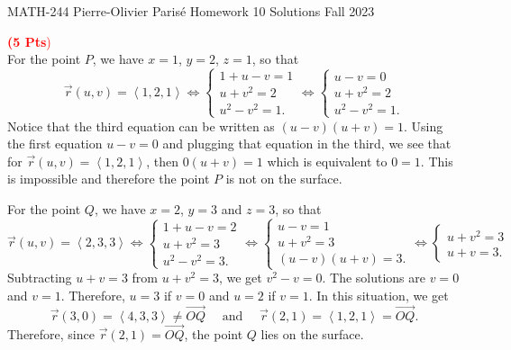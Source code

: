 \documentclass[12pt]{article}
\newcommand{\spc}{\vspace*{0.5cm}}
\newcommand{\exo}[3]{\noindent\textcolor{red}{\fbox{\textbf{Section {#1}, Problem {#2}}}\hrulefill   \textbf{({#3} Pts})}\vspace*{10pt}}
\begin{document}
\thispagestyle{empty}
	\noindent \hrulefill \newline
	MATH-244 \hfill Pierre-Olivier Paris{\'e}\newline
	Homework 10 Solutions \hfill Fall 2023\newline \vspace*{-0.7cm}
	
	\noindent\hrulefill
	
	\spc

	\exo{16.6}{2}{5}
	\\ 
	For the point $P$, we have $x = 1$, $y = 2$, $z=1$, so that
		\[
			\vec{r} (u, v) = \left\langle 1, 2, 1 \right\rangle \iff \left\lbrace \begin{matrix} 1 + u - v = 1 \\ 
			u + v^2 = 2 \\ 
			u^2 - v^2 = 1 . \end{matrix}\right. \iff \left\lbrace \begin{matrix} u - v = 0 \\ 
			u + v^2 = 2 \\ 
			u^2 - v^2 = 1 . \end{matrix}\right. 
		\]
	Notice that the third equation can be written as $(u - v)(u + v) = 1$. Using the first equation $u - v = 0$ and plugging that equation in the third, we see that for $\vec{r} (u, v) = \left\langle 1 , 2, 1 \right\rangle$, then $0 (u + v) = 1$ which is equivalent to $0 = 1$. This is impossible and therefore the point $P$ is not on the surface.

	For the point $Q$, we have $x = 2$, $y = 3$ and $z = 3$, so that
		\[
			\vec{r} (u, v) = \left\langle 2, 3, 3 \right\rangle \iff \left\lbrace \begin{matrix} 1 + u - v = 2 \\ 
			u + v^2 = 3 \\ 
			u^2 - v^2 = 3 . \end{matrix}\right. \iff \left\lbrace \begin{matrix} u - v = 1 \\ 
			u + v^2 = 3 \\ 
			(u-v)(u+ v) = 3 . \end{matrix}\right.
			\iff \left\lbrace \begin{matrix} u + v^2 = 3 \\ 
			u + v = 3 . \end{matrix}\right.
		\]
	Subtracting $u + v = 3$ from $u + v^2 = 3$, we get $v^2 - v = 0$. The solutions are $v = 0$ and $v = 1$. Therefore, $u = 3$ if $v = 0$ and $u = 2$ if $v = 1$. In this situation, we get
		\[
			\vec{r} (3, 0) = \left\langle 4, 3, 3 \right\rangle \neq \vec{OQ} \quad \text{ and } \quad \vec{r} (2, 1) = \left\langle 1, 2, 1 \right\rangle = \vec{OQ} .
		\]
	Therefore, since $\vec{r} (2, 1) = \vec{OQ}$, the point $Q$ lies on the surface.
\end{document}
